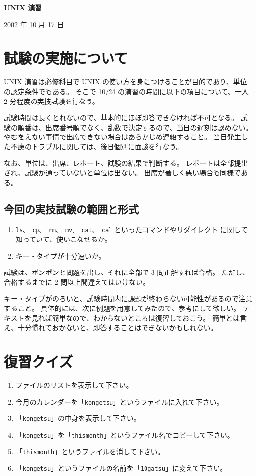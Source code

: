 \documentclass[11pt]{jarticle}
\begin{document}
\setlength{\baselineskip}{7mm}
\begin{center}
\textbf{\Large UNIX 演習}\\
\bigskip

2002 年 10 月 17 日
\end{center}

\section*{試験の実施について}

 UNIX 演習は必修科目で UNIX の使い方を身につけることが目的であり、単位の認定条件でもある。
そこで 10/24 の演習の時間に以下の項目について、一人 2 分程度の実技試験を行なう。

試験時間は長くとれないので、基本的にほぼ即答できなければ不可となる。
試験の順番は、出席番号順でなく、乱数で決定するので、当日の遅刻は認めない。
やむをえない事情で出席できない場合はあらかじめ連絡すること。
当日発生した不慮のトラブルに関しては、後日個別に面談を行なう。

なお、単位は、出席、レポート、試験の結果で判断する。
レポートは全部提出され、試験が通っていないと単位は出ない。
出席が著しく悪い場合も同様である。

\subsection*{今回の実技試験の範囲と形式}

\begin{enumerate}
\item \texttt{ls、 cp、 rm、 mv、 cat、 cal} といったコマンドやリダイレクト
に関して知っていて、使いこなせるか。
\item キー・タイプが十分速いか。
\end{enumerate}

試験は、ポンポンと問題を出し、それに全部で 3 問正解すれば合格。
ただし、合格するまでに 2 問以上間違えてはいけない。

キー・タイプがのろいと、試験時間内に課題が終わらない可能性があるので注意すること。
具体的には、次に例題を用意してみたので、参考にして欲しい。
テキストを見れば簡単なので、わからないところは復習しておこう。
簡単とは言え、十分慣れておかないと、即答することはできないかもしれない。

\section*{復習クイズ}

\begin{enumerate}
\item ファイルのリストを表示して下さい。
\item 今月のカレンダーを「\texttt{kongetsu}」というファイルに入れて下さい。
\item 「\texttt{kongetsu}」の中身を表示して下さい。
\item 「\texttt{kongetsu}」を「\texttt{thismonth}」というファイル名でコピーして下さい。
\item 「\texttt{thismonth}」というファイルを消して下さい。
\item 「\texttt{kongetsu}」というファイルの名前を「\texttt{10gatsu}」に変えて下さい。
\end{enumerate}
\end{document}
